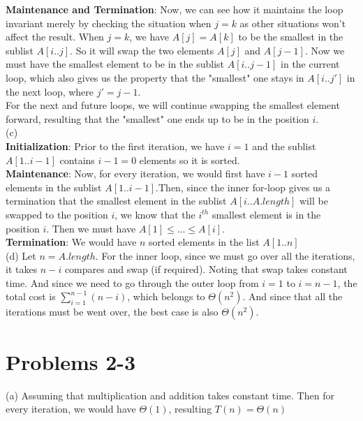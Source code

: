 \documentclass[14pt]{article}
\begin{document}
\textbf{Maintenance and Termination}: 
Now, we can see how it maintains the loop invariant merely by checking the situation when $j = k$ as other situations won't affect the result. 
When $j = k$, we have $A[j] = A[k]$ to be the smallest in the sublist $A[i..j]$. So it will swap the two elements $A[j]$ and $A[j - 1]$. Now we must have the smallest element to be in the sublist $A[i..j-1]$ in the current loop, which also gives us the property that the "smallest" one stays in $A[i..j']$ in the next loop, where $j' = j - 1$.\\

For the next and future loops, we will continue swapping the smallest element forward, resulting that the "smallest" one ends up to be in the position $i$.\\

\noindent (c)\\

\textbf{Initialization}:
Prior to the first iteration, we have $i = 1$ and the sublist $A[1..i-1]$ contains $i - 1 = 0$ elements so it is sorted.\\

\textbf{Maintenance}: 
Now, for every iteration, we would first have $i - 1$ sorted elements in the sublist $A[1..i-1]$.Then, since the inner for-loop gives us a termination that the smallest element in the sublist $A[i..A.length]$ will be swapped to the position $i$, we know that the $i^{th}$ smallest element is in the position $i$. Then we must have $A[1] \leq ... \leq A[i]$. \\

\textbf{Termination}: We would have $n$ sorted elements in the list $A[1..n]$\\

\noindent(d) Let $n = A.length$. For the inner loop, since we must go over all the iterations, it takes $n - i$ compares and swap (if required). Noting that swap takes constant time. And since we need to go through the outer loop from $i = 1$ to $i = n - 1$, the total cost is $\sum_{i = 1}^{n - 1} (n - i)$, which belongs to $\Theta (n^2)$. And since that all the iterations must be went over, the best case is also $\Theta(n^2)$.


\pagebreak
\section*{Problems 2-3}
(a) Assuming that multiplication and addition takes constant time. Then for every iteration, we would have $\Theta(1)$, resulting $T(n) = \Theta(n)$\\
\end{document}
